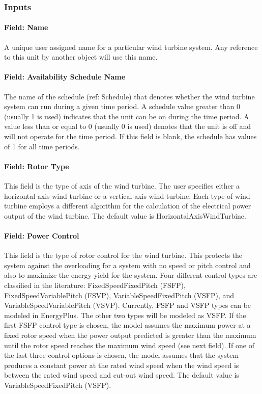 \subsubsection{Inputs}\label{inputs-23}

\paragraph{Field: Name}\label{field-name-27}

A unique user assigned name for a particular wind turbine system. Any reference to this unit by another object will use this name.

\paragraph{Field: Availability Schedule Name}\label{field-availability-schedule-name-8-000}

The name of the schedule (ref: Schedule) that denotes whether the wind turbine system can run during a given time period. A schedule value greater than 0 (usually 1 is used) indicates that the unit can be on during the time period. A value less than or equal to 0 (usually 0 is used) denotes that the unit is off and will not operate for the time period. If this field is blank, the schedule has values of 1 for all time periods.

\paragraph{Field: Rotor Type}\label{field-rotor-type}

This field is the type of axis of the wind turbine. The user specifies either a horizontal axis wind turbine or a vertical axis wind turbine. Each type of wind turbine employs a different algorithm for the calculation of the electrical power output of the wind turbine. The default value is HorizontalAxisWindTurbine.

\paragraph{Field: Power Control}\label{field-power-control}

This field is the type of rotor control for the wind turbine. This protects the system against the overloading for a system with no speed or pitch control and also to maximize the energy yield for the system. Four different control types are classified in the literature: FixedSpeedFixedPitch (FSFP), FixedSpeedVariablePitch (FSVP), VariableSpeedFixedPitch (VSFP), and VariableSpeedVariablePitch (VSVP). Currently, FSFP and VSFP types can be modeled in EnergyPlus. The other two types will be modeled as VSFP. If the first FSFP control type is chosen, the model assumes the maximum power at a fixed rotor speed when the power output predicted is greater than the maximum until the rotor speed reaches the maximum wind speed (see next field). If one of the last three control options is chosen, the model assumes that the system produces a constant power at the rated wind speed when the wind speed is between the rated wind speed and cut-out wind speed. The default value is VariableSpeedFixedPitch (VSFP).


